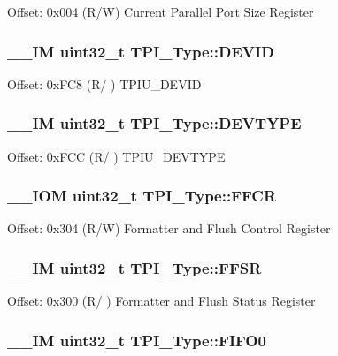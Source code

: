 Offset\-: 0x004 (R/\-W) Current Parallel Port Size Register \hypertarget{struct_t_p_i___type_abc0ecda8a5446bc754080276bad77514}{
\subsubsection[{D\-E\-V\-I\-D}]{\setlength{\rightskip}{0pt plus 5cm}\-\_\-\-\_\-\-I\-M uint32\-\_\-t T\-P\-I\-\_\-\-Type\-::\-D\-E\-V\-I\-D}}\label{struct_t_p_i___type_abc0ecda8a5446bc754080276bad77514}
Offset\-: 0x\-F\-C8 (R/ ) T\-P\-I\-U\-\_\-\-D\-E\-V\-I\-D \hypertarget{struct_t_p_i___type_ad98855854a719bbea33061e71529a472}{
\subsubsection[{D\-E\-V\-T\-Y\-P\-E}]{\setlength{\rightskip}{0pt plus 5cm}\-\_\-\-\_\-\-I\-M uint32\-\_\-t T\-P\-I\-\_\-\-Type\-::\-D\-E\-V\-T\-Y\-P\-E}}\label{struct_t_p_i___type_ad98855854a719bbea33061e71529a472}
Offset\-: 0x\-F\-C\-C (R/ ) T\-P\-I\-U\-\_\-\-D\-E\-V\-T\-Y\-P\-E \hypertarget{struct_t_p_i___type_a3f68b6e73561b4849ebf953a894df8d2}{
\subsubsection[{F\-F\-C\-R}]{\setlength{\rightskip}{0pt plus 5cm}\-\_\-\-\_\-\-I\-O\-M uint32\-\_\-t T\-P\-I\-\_\-\-Type\-::\-F\-F\-C\-R}}\label{struct_t_p_i___type_a3f68b6e73561b4849ebf953a894df8d2}
Offset\-: 0x304 (R/\-W) Formatter and Flush Control Register \hypertarget{struct_t_p_i___type_a6c47a0b4c7ffc66093ef993d36bb441c}{
\subsubsection[{F\-F\-S\-R}]{\setlength{\rightskip}{0pt plus 5cm}\-\_\-\-\_\-\-I\-M uint32\-\_\-t T\-P\-I\-\_\-\-Type\-::\-F\-F\-S\-R}}\label{struct_t_p_i___type_a6c47a0b4c7ffc66093ef993d36bb441c}
Offset\-: 0x300 (R/ ) Formatter and Flush Status Register \hypertarget{struct_t_p_i___type_aa4d7b5cf39dff9f53bf7f69bc287a814}{
\subsubsection[{F\-I\-F\-O0}]{\setlength{\rightskip}{0pt plus 5cm}\-\_\-\-\_\-\-I\-M uint32\-\_\-t T\-P\-I\-\_\-\-Type\-::\-F\-I\-F\-O0}}\label{struct_t_p_i___type_aa4d7b5cf39dff9f53bf7f69bc287a814}
